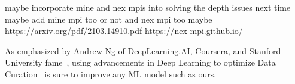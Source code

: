 maybe incorporate mine and nex mpis into solving the depth issues next time
maybe add mine mpi too or not	and nex mpi too maybe
https://arxiv.org/pdf/2103.14910.pdf	https://nex-mpi.github.io/



As emphasized by Andrew Ng of DeepLearning.AI, Coursera, and Stanford University fame~\cite{bescond_deep-dive_2021}, using advancements in Deep Learning to optimize Data Curation~\cite{thirumuruganathan_data_2019} is sure to improve any ML model such as ours.









